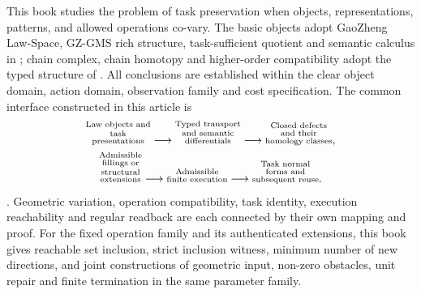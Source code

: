\documentclass[12pt,a4paper,openany,notitlepage]{report}
\theoremstyle{plain}
\theoremstyle{definition}
\theoremstyle{remark}
\begin{document}
\begin{CJK*}
This book studies the problem of task preservation when objects, representations, patterns, and allowed operations co-vary. The basic objects adopt GaoZheng Law-Space, GZ-GMS rich structure, task-sufficient quotient and semantic calculus in \cite{GFrameworkSynthesis,S01,S38}; chain complex, chain homotopy and higher-order compatibility adopt the typed structure of \cite{ExtHatcher,ExtWeibel,ExtStacks,ExtLadaMarkl}. All conclusions are established within the clear object domain, action domain, observation family and cost specification. The common interface constructed in this article is \begin{equation}
\label{hgov:eq:spine}
\begin{gathered}
\text{\shortstack[c]{\scriptsize Law objects and\\[-1pt]\scriptsize task\\[-1pt]\scriptsize presentations}}\longrightarrow
\text{\shortstack[c]{\scriptsize Typed transport\\[-1pt]\scriptsize and semantic\\[-1pt]\scriptsize differentials}}\longrightarrow
\text{\shortstack[c]{\scriptsize Closed defects\\[-1pt]\scriptsize and their\\[-1pt]\scriptsize homology classes}},\\
\text{\shortstack[c]{\scriptsize Admissible\\[-1pt]\scriptsize fillings or\\[-1pt]\scriptsize structural\\[-1pt]\scriptsize extensions}}\longrightarrow
\text{\shortstack[c]{\scriptsize Admissible\\[-1pt]\scriptsize finite execution}}\longrightarrow
\text{\shortstack[c]{\scriptsize Task normal\\[-1pt]\scriptsize forms and\\[-1pt]\scriptsize subsequent reuse}}.
\end{gathered}
\end{equation}. Geometric variation, operation compatibility, task identity, execution reachability and regular readback are each connected by their own mapping and proof. For the fixed operation family and its authenticated extensions, this book gives reachable set inclusion, strict inclusion witness, minimum number of new directions, and joint constructions of geometric input, non-zero obstacles, unit repair and finite termination in the same parameter family.


\label{hgov:sec:atoms}


\end{CJK*}
\end{document}
